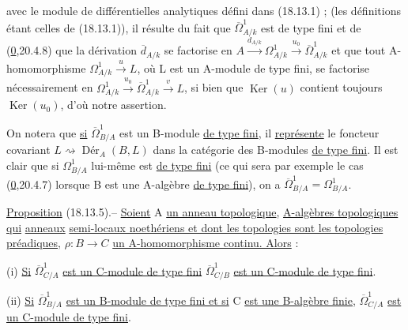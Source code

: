 
 avec le module de différentielles analytiques défini dans (18.13.1) ;   (les définitions étant celles de (18.13.1)), il résulte du fait que $\overline{\Omega}^{1}_{A/k}$ est de type fini  et de (\uline{0},20.4.8) que  la dérivation $\overline{d}_{A/k}$ se factorise en  $A\xrightarrow{d_{A/k}}\Omega^1_{A/k}\xrightarrow{u_0}\overline{\Omega}^1_{A/k}$ et que tout A-homomorphisme  $\Omega^1_{A/k}\xrightarrow{u}L$, où L est un A-module de type fini, se factorise nécessairement en $\Omega^1_{A/k}\xrightarrow{u_0}\overline{\Omega}^1_{A/k}\xrightarrow{v}L$, si bien que $\operatorname{Ker}(u)$ contient toujours $\operatorname{Ker}(u_0)$, d'où notre assertion.

On notera que \uline{si} $\overline{\Omega}^1_{B/A}$ est un B-module \uline{de type fini}, il \uline{représente} le foncteur covariant $L\rightsquigarrow\operatorname{Dér}_A(B,L)$ dans la catégorie des B-modules \uline{de type fini}.  Il est clair que si $\Omega^1_{B/A}$ lui-même est \uline{de type fini} (ce qui sera par exemple le cas (\uline{0},20.4.7) lorsque B est une A-algèbre \uline{de type fini}), on a $\overline{\Omega}^1_{B/A}=\Omega^1_{B/A}$.

\uline{Proposition} (18.13.5).-- \uline{Soient} A \uline{un anneau topologique},   \uline{A-algèbres topologiques qui}   \uline{anneaux}  \uline{semi-locaux noethériens et dont les topologies sont les topologies préadiques}, $\rho:B\to C$ \uline{un A-homomorphisme continu. Alors} :


(i) \uline{Si}  $\overline{\Omega}^1_{C/A}$ \uline{est un C-module de type fini}  $\overline{\Omega}^1_{C/B}$ \uline{est un C-module de type fini}.

(ii) \uline{Si} $\overline{\Omega}^1_{B/A}$ \uline{est un B-module de type fini et si} C \uline{est une B-algèbre finie}, $\overline{\Omega}^1_{C/A}$ \uline{est un C-module de type fini}.

